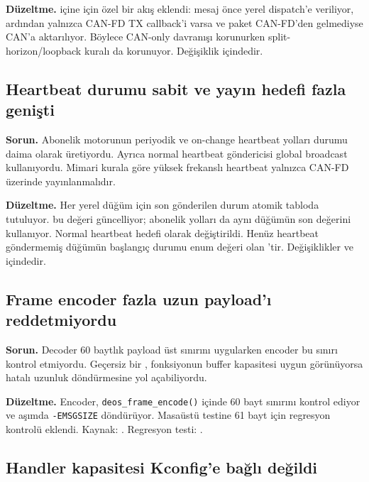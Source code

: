 \documentclass[a4paper,11pt]{article}
\begin{document}
\textbf{Düzeltme.}  içine  için
özel bir akış eklendi: mesaj önce yerel dispatch’e veriliyor, ardından yalnızca
CAN-FD TX callback’i varsa ve paket CAN-FD’den gelmediyse CAN’a aktarılıyor.
Böylece CAN-only davranışı korunurken split-horizon/loopback kuralı da
korunuyor. Değişiklik  içindedir.

\enlargethispage{2\baselineskip}
\subsection{Heartbeat durumu sabit ve yayın hedefi fazla genişti}

\textbf{Sorun.} Abonelik motorunun periyodik ve on-change heartbeat yolları
durumu daima  olarak üretiyordu. Ayrıca normal
heartbeat göndericisi global broadcast  kullanıyordu. Mimari
kurala göre yüksek frekanslı heartbeat yalnızca CAN-FD üzerinde yayınlanmalıdır.

\textbf{Düzeltme.} Her yerel düğüm için son gönderilen durum atomik tabloda
tutuluyor.  bu değeri güncelliyor;
abonelik yolları da aynı düğümün son değerini kullanıyor. Normal heartbeat
hedefi  olarak değiştirildi. Henüz heartbeat
göndermemiş düğümün başlangıç durumu enum değeri olan ’tir.
Değişiklikler  ve 
içindedir.

\subsection{Frame encoder fazla uzun payload’ı reddetmiyordu}

\textbf{Sorun.} Decoder 60 baytlık payload üst sınırını uygularken encoder bu
sınırı kontrol etmiyordu. Geçersiz bir , fonksiyonun buffer
kapasitesi uygun görünüyorsa hatalı uzunluk döndürmesine yol açabiliyordu.

\textbf{Düzeltme.} Encoder, \texttt{deos\_frame\_encode()} içinde 60 bayt
sınırını kontrol ediyor ve aşımda \texttt{-EMSGSIZE} döndürüyor.
Masaüstü testine 61 bayt için regresyon kontrolü eklendi.
Kaynak: .
Regresyon testi: .

\subsection{Handler kapasitesi Kconfig’e bağlı değildi}
\end{document}
